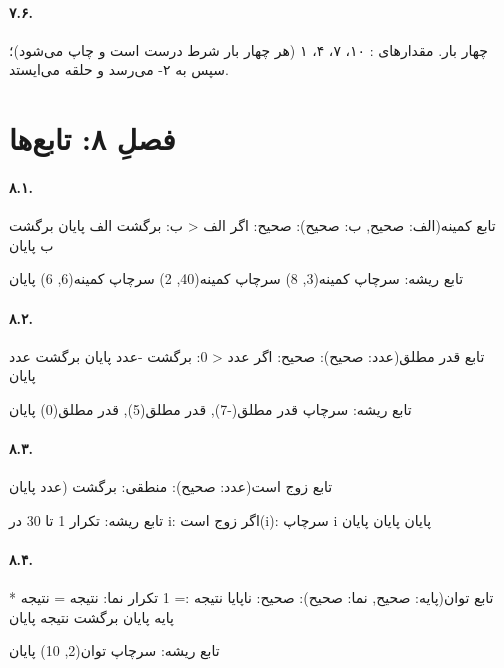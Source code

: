 \paragraph{۷.۶.} چهار بار. مقدارهای : ۱۰، ۷، ۴، ۱ (هر چهار بار
شرط درست است و چاپ می‌شود)؛ سپس  به ۲- می‌رسد و حلقه می‌ایستد.

\section*{فصلِ ۸: تابع‌ها}

\paragraph{۸.۱.}
\begin{salamfa}
تابع کمینه(الف: صحیح, ب: صحیح): صحیح:
    اگر الف < ب:
        برگشت الف
    پایان
    برگشت ب
پایان

تابع ریشه:
    سرچاپ کمینه(3, 8)
    سرچاپ کمینه(40, 2)
    سرچاپ کمینه(6, 6)
پایان
\end{salamfa}

\paragraph{۸.۲.}
\begin{salamfa}
تابع قدر مطلق(عدد: صحیح): صحیح:
    اگر عدد < 0:
        برگشت -عدد
    پایان
    برگشت عدد
پایان

تابع ریشه:
    سرچاپ قدر مطلق(-7), قدر مطلق(5), قدر مطلق(0)
پایان
\end{salamfa}

\paragraph{۸.۳.}
\begin{salamfa}
تابع زوج است(عدد: صحیح): منطقی:
    برگشت (عدد %
پایان

تابع ریشه:
    تکرار 1 تا 30 در i:
        اگر زوج است(i):
            سرچاپ i
        پایان
    پایان
پایان
\end{salamfa}

\paragraph{۸.۴.}
\begin{salamfa}
تابع توان(پایه: صحیح, نما: صحیح): صحیح:
    ناپایا نتیجه := 1
    تکرار نما:
        نتیجه = نتیجه * پایه
    پایان
    برگشت نتیجه
پایان

تابع ریشه:
    سرچاپ توان(2, 10)
پایان
\end{salamfa}

